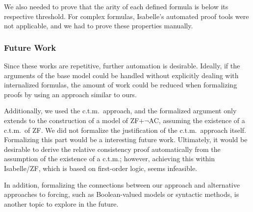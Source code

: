 \documentclass{report}
\begin{document}
We also needed to prove that the arity of each defined formula is below its respective threshold.
For complex formulas, Isabelle's automated proof tools were not applicable, 
and we had to prove these properties manually.

\subsubsection{Future Work}

Since these works are repetitive, further automation is desirable.
Ideally, if the arguments of the base model could be handled without explicitly dealing with internalized formulas, 
the amount of work could be reduced when formalizing proofs by using an approach similar to ours.

Additionally, we used the c.t.m.\ approach, and the formalized argument only extends to the construction of a model of ZF+$\neg$AC,
assuming the existence of a c.t.m.\ of ZF.
We did not formalize the justification of the c.t.m.\ approach itself.
Formalizing this part would be a interesting future work.
Ultimately, it would be desirable to derive the relative consistency proof automatically from the assumption of the existence of a c.t.m.; 
however, achieving this within Isabelle/ZF, which is based on first-order logic, seems infeasible.

In addition, formalizing the connections between our approach and alternative approaches to forcing, 
such as Boolean-valued models or syntactic methods, is another topic to explore in the future.

\printbibliography
\end{document}
